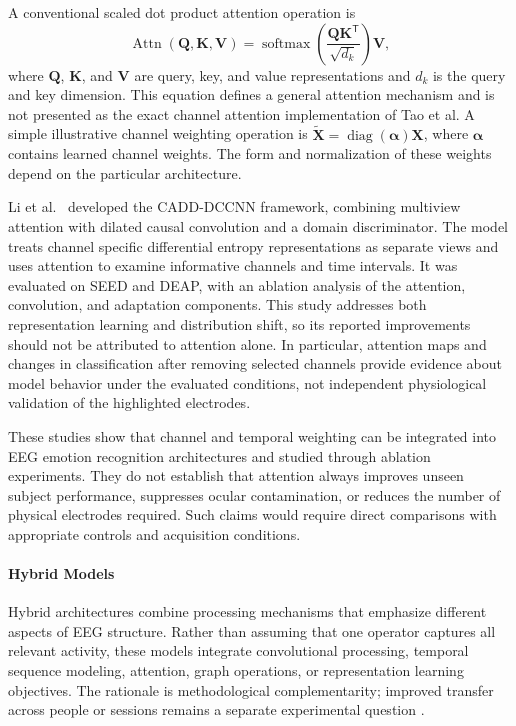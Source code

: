 \documentclass[ASNA,twocolumn]{USG}
\begin{document}
A conventional scaled dot product attention operation is
\begin{equation}
\operatorname{Attn}(\mathbf{Q},\mathbf{K},\mathbf{V})=
\operatorname{softmax}\!\left(
\frac{\mathbf{Q}\mathbf{K}^{\mathsf{T}}}{\sqrt{d_k}}
\right)\mathbf{V},
\label{eq:deep_scaled_attention}
\end{equation}
where $\mathbf{Q}$, $\mathbf{K}$, and $\mathbf{V}$ are query, key, and value representations and $d_k$ is the query and key dimension. This equation defines a general attention mechanism and is not presented as the exact channel attention implementation of Tao et al. A simple illustrative channel weighting operation is
$\widetilde{\mathbf{X}}=\operatorname{diag}(\boldsymbol{\alpha})\mathbf{X}$,
where $\boldsymbol{\alpha}$ contains learned channel weights. The form and normalization of these weights depend on the particular architecture.

Li et al.~\cite{li2024multi} developed the CADD-DCCNN framework, combining multiview attention with dilated causal convolution and a domain discriminator. The model treats channel specific differential entropy representations as separate views and uses attention to examine informative channels and time intervals. It was evaluated on SEED and DEAP, with an ablation analysis of the attention, convolution, and adaptation components. This study addresses both representation learning and distribution shift, so its reported improvements should not be attributed to attention alone. In particular, attention maps and changes in classification after removing selected channels provide evidence about model behavior under the evaluated conditions, not independent physiological validation of the highlighted electrodes.

These studies show that channel and temporal weighting can be integrated into EEG emotion recognition architectures and studied through ablation experiments. They do not establish that attention always improves unseen subject performance, suppresses ocular contamination, or reduces the number of physical electrodes required. Such claims would require direct comparisons with appropriate controls and acquisition conditions.

\paragraph{Hybrid Models}
\label{sec:hybrid_models}

Hybrid architectures combine processing mechanisms that emphasize different aspects of EEG structure. Rather than assuming that one operator captures all relevant activity, these models integrate convolutional processing, temporal sequence modeling, attention, graph operations, or representation learning objectives. The rationale is methodological complementarity; improved transfer across people or sessions remains a separate experimental question \cite{suhaimi2020eeg,li2021physiological}.
\end{document}
